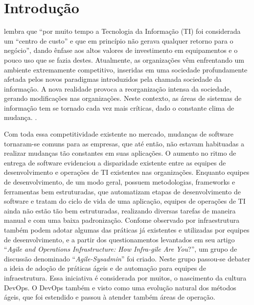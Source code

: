 \documentclass[twoside,english,brazilian]{UNISINOSartigo}
\begin{document}
\section{Introdução}

 lembra que ``por muito tempo a Tecnologia da Informação (TI) foi considerada um ``centro de custo''  e que em princípio não gerava qualquer retorno para o negócio'', dando ênfase aos altos valores de investimento em equipamentos e o pouco uso que se fazia destes.  Atualmente, as organizações vêm enfrentando um ambiente extremamente competitivo, inseridas em uma sociedade profundamente afetada pelos novos paradigmas introduzidos pela chamada sociedade da informação. A nova realidade provoca a reorganização intensa da sociedade, gerando modificações nas organizações. Neste contexto, as áreas de sistemas de informação tem se tornado cada vez mais críticas, dado o constante clima de mudança.  \cite[p. 15]{AudyFreitag08}.

Com toda essa competitividade existente no mercado, mudanças de software tornaram-se comuns para as empresas, que até então, não estavam habituadas a realizar mudanças tão constantes em suas aplicações. O aumento no ritmo de entrega de software evidenciou a disparidade existente entre as equipes de desenvolvimento e operações de TI existentes nas organizações. Enquanto equipes de desenvolvimento, de um modo geral, possuem metodologias, frameworks e ferramentas bem estruturadas, que automatizam etapas de desenvolvimento de software e tratam do ciclo de vida de uma aplicação, equipes de operações de TI ainda  não estão tão bem estruturadas, realizando diversas tarefas de maneira manual e com uma baixa padronização. 
Confome observado por  infraestrutura também podem adotar algumas das práticas já existentes e utilizadas por equipes de desenvolvimento, e a partir dos questionamentos levantados em seu artigo ``\textit{Agile and Operations Infrastructure: How Infra-gile Are You}?'', um grupo de discussão denominado ``\textit{Agile-Sysadmin}''  foi criado. Neste grupo passou-se debater a ideia de adoção de práticas ágeis e de automação para equipes de infraestrutura. Essa iniciativa é considerada por muitos, o nascimento da cultura DevOps. O DevOps também e visto como uma evolução natural dos métodos ágeis, que foi estendido e passou à atender também áreas de operação. 
\end{document}
